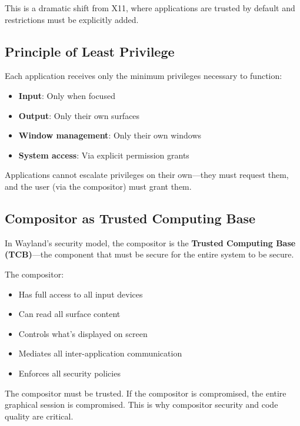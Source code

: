 This is a dramatic shift from X11, where applications are trusted by default and restrictions must be explicitly added.

\subsection{Principle of Least Privilege}

Each application receives only the minimum privileges necessary to function:

\begin{itemize}
    \item \textbf{Input}: Only when focused
    \item \textbf{Output}: Only their own surfaces
    \item \textbf{Window management}: Only their own windows
    \item \textbf{System access}: Via explicit permission grants
\end{itemize}

Applications cannot escalate privileges on their own—they must request them, and the user (via the compositor) must grant them.

\subsection{Compositor as Trusted Computing Base}

In Wayland's security model, the compositor is the \textbf{Trusted Computing Base (TCB)}—the component that must be secure for the entire system to be secure.

The compositor:
\begin{itemize}
    \item Has full access to all input devices
    \item Can read all surface content
    \item Controls what's displayed on screen
    \item Mediates all inter-application communication
    \item Enforces all security policies
\end{itemize}

\begin{importantbox}
The compositor must be trusted. If the compositor is compromised, the entire graphical session is compromised. This is why compositor security and code quality are critical.
\end{importantbox}

